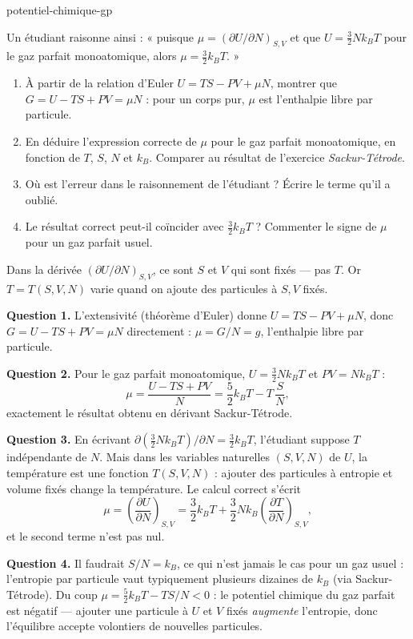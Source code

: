 \begin{exo}{potentiel-chimique-gp}

Un étudiant raisonne ainsi : « puisque $\mu = \left(\partial U/\partial N\right)_{S,V}$ et que $U = \frac{3}{2}Nk_BT$ pour le gaz parfait monoatomique, alors $\mu = \frac{3}{2}k_BT$. »

\begin{enumerate}
\item À partir de la relation d'Euler $U = TS - PV + \mu N$, montrer que $G = U - TS + PV = \mu N$ : pour un corps pur, $\mu$ est l'enthalpie libre par particule.
\item En déduire l'expression correcte de $\mu$ pour le gaz parfait monoatomique, en fonction de $T$, $S$, $N$ et $k_B$. Comparer au résultat de l'exercice \textit{Sackur-Tétrode}.
\item Où est l'erreur dans le raisonnement de l'étudiant ? Écrire le terme qu'il a oublié.
\item Le résultat correct peut-il coïncider avec $\frac{3}{2}k_BT$ ? Commenter le signe de $\mu$ pour un gaz parfait usuel.
\end{enumerate}

\begin{indication}
Dans la dérivée $\left(\partial U/\partial N\right)_{S,V}$, ce sont $S$ et $V$ qui sont fixés — pas $T$. Or $T = T(S,V,N)$ varie quand on ajoute des particules à $S,V$ fixés.
\end{indication}

\begin{solution}
\textbf{Question 1.} L'extensivité (théorème d'Euler) donne $U = TS - PV + \mu N$, donc $G = U - TS + PV = \mu N$ directement : $\mu = G/N = g$, l'enthalpie libre par particule.

\textbf{Question 2.} Pour le gaz parfait monoatomique, $U = \tfrac{3}{2}Nk_BT$ et $PV = Nk_BT$ :
\[
\mu = \frac{U - TS + PV}{N} = \frac{5}{2}k_BT - T\,\frac{S}{N},
\]
exactement le résultat obtenu en dérivant Sackur-Tétrode. \checkmark

\textbf{Question 3.} En écrivant $\partial(\tfrac{3}{2}Nk_BT)/\partial N = \tfrac{3}{2}k_BT$, l'étudiant suppose $T$ indépendante de $N$. Mais dans les variables naturelles $(S,V,N)$ de $U$, la température est une fonction $T(S,V,N)$ : ajouter des particules à entropie et volume fixés change la température. Le calcul correct s'écrit
\[
\mu = \left(\frac{\partial U}{\partial N}\right)_{S,V} = \frac{3}{2}k_BT + \frac{3}{2}Nk_B\left(\frac{\partial T}{\partial N}\right)_{S,V},
\]
et le second terme n'est pas nul.

\textbf{Question 4.} Il faudrait $S/N = k_B$, ce qui n'est jamais le cas pour un gaz usuel : l'entropie par particule vaut typiquement plusieurs dizaines de $k_B$ (via Sackur-Tétrode). Du coup $\mu = \tfrac{5}{2}k_BT - T S/N < 0$ : le potentiel chimique du gaz parfait est négatif — ajouter une particule à $U$ et $V$ fixés \emph{augmente} l'entropie, donc l'équilibre accepte volontiers de nouvelles particules.
\end{solution}
\end{exo}

